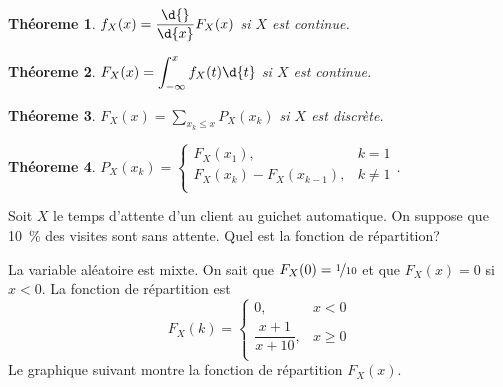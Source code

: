 \documentclass[11pt]{article}
\newtheorem{theoreme}{Théoreme}[section]
\begin{document}
\begin{theoreme}
	$f_X(x)=\dfrac{\d{}}{\d{x}}F_X(x)$ si $X$ est continue.
\end{theoreme}

\begin{theoreme}
	$F_X(x)=\displaystyle\int_{-\infty}^xf_X(t)\d{t}$ si $X$ est continue.
\end{theoreme}

\begin{theoreme}\label{th:masse_repartition}
	$F_X(x)=\displaystyle\sum_{x_k\leq x}P_X(x_k)$ si $X$ est discrète.
\end{theoreme}

\begin{theoreme}
	$P_X(x_k)=\left\{
		\begin{matrix}
			F_X(x_1), & k=1\\
			F_X(x_k)-F_X(x_{k-1}), & k\neq 1\\
		\end{matrix}
	\right.$.
\end{theoreme}

\begin{exemple}
	Soit $X$ le temps d'attente d'un client au guichet automatique. On suppose
	que \SI{10}{\percent} des visites sont sans attente. Quel est la fonction
	de répartition?
	
	La variable aléatoire est mixte. On sait que $F_X(0)=\nicefrac{1}{10}$ et
	que $F_X(x)=0$ si $x<0$. La fonction de répartition est
	\begin{equation*}
		F_X(k)=\left\{
			\begin{matrix}
				0, & x < 0\\
				\dfrac{x+1}{x+10}, & x \geq 0\\
			\end{matrix}
		\right.
	\end{equation*}
	Le graphique suivant montre la fonction de répartition $F_X(x)$.
	\begin{figure}[H]
		\centering
		
	\end{figure}
\end{exemple}
\end{document}
